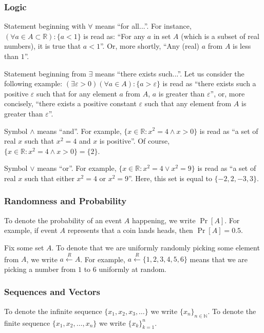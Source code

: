 \documentclass[../lecture-notes.tex]{subfiles}
\begin{document}
\subsubsection{Logic}

Statement beginning with $\forall$ means ``for all...''. For instance, $(\forall a \in A \subset \mathbb{R}): \{a < 1\}$ is read as: ``For any $a$ in set $A$ (which is a subset of real numbers), it is true that $a<1$''. Or, more shortly, ``Any (real) $a$ from $A$ is less than $1$''.

Statement beginning from $\exists$ means ``there exists such...''. Let us consider the following example: $(\exists \varepsilon > 0) (\forall a \in A): \{a > \varepsilon\}$ is read as ``there exists such a positive $\varepsilon$ such that for any element $a$ from $A$, $a$ is greater than $\varepsilon$'', or, more concisely, ``there exists a positive constant $\varepsilon$ such that any element from $A$ is greater than $\varepsilon$''.

Symbol $\wedge$ means ``and''. For example, $\{x \in \mathbb{R}: x^2 = 4 \wedge x > 0\}$ is read as ``a set of real $x$ such that $x^2=4$ and $x$ is positive''. Of course, $\{x \in \mathbb{R}: x^2 = 4 \wedge x > 0\} = \{2\}$.

Symbol $\vee$ means ``or''. For example, $\{x \in \mathbb{R}: x^2 = 4 \vee x^2 = 9\}$ is read as ``a set of real $x$ such that either $x^2=4$ or $x^2=9$''. Here, this set is equal to $\{-2,2,-3,3\}$.

\subsubsection{Randomness and Probability}

To denote the probability of an event $A$ happening, we write $\Pr[A]$. For example, if event $A$ represents that a coin lands heads, then $\Pr[A] = 0.5$.

Fix some set $A$. To denote that we are uniformly randomly picking some element from $A$, we write $a \xleftarrow{R} A$. For example, $a \xleftarrow{R} \{1,2,3,4,5,6\}$ means that we are picking a number from $1$ to $6$ uniformly at random.

\subsubsection{Sequences and Vectors}

To denote the infinite sequence $\{x_1,x_2,x_3,\dots\}$ we write $\{x_n\}_{n \in \mathbb{N}}$. To denote the finite sequence $\{x_1,x_2,\dots,x_n\}$ we write $\{x_k\}_{k=1}^n$. 
\end{document}
